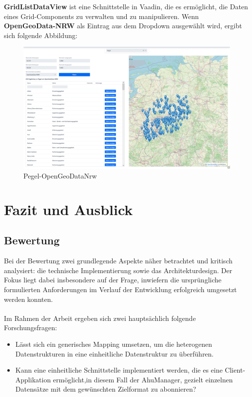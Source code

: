 \documentclass[a4paper,12pt]{scrreprt}
\begin{document}
\textbf{GridListDataView} ist eine Schnittstelle in Vaadin, die es ermöglicht, die Daten eines Grid-Components zu verwalten und zu manipulieren.
\clearpage
Wenn \textbf{OpenGeoData-NRW} als Eintrag aus dem Dropdown ausgewählt wird, ergibt sich folgende Abbildung:
\begin{figure}[H]
	\centering
	\includegraphics[width=18cm]{pegel-opengeodata.png}
	\caption{\label{}Pegel-OpenGeoDataNrw}
\end{figure}
\chapter{Fazit und Ausblick}

\section{Bewertung}
Bei der Bewertung  zwei grundlegende Aspekte näher betrachtet und kritisch analysiert: die technische Implementierung sowie das Architekturdesign. Der Fokus liegt dabei insbesondere auf der Frage, inwiefern die ursprüngliche formulierten Anforderungen im Verlauf der Entwicklung erfolgreich umgesetzt werden konnten.\\ \\
Im Rahmen der Arbeit ergeben sich zwei hauptsächlich folgende Forschungsfragen:
\begin{itemize}
	\item Lässt sich ein generisches Mapping umsetzen, um die heterogenen Datenstrukturen in eine einheitliche Datenstruktur zu überführen.
	\item Kann eine einheitliche Schnittstelle implementiert werden, die es eine Client-Applikation ermöglicht,in diesem Fall der AhuManager, gezielt einzelnen Datensätze mit dem gewünschten Zielformat zu abonnieren?
\end{itemize}
\end{document}
